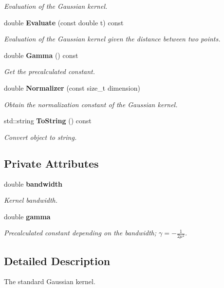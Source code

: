\begin{DoxyCompactItemize}
\begin{DoxyCompactList}\small\item\em Evaluation of the Gaussian kernel. \end{DoxyCompactList}\item 
double {\bf Evaluate} (const double t) const 
\begin{DoxyCompactList}\small\item\em Evaluation of the Gaussian kernel given the distance between two points. \end{DoxyCompactList}\item 
double {\bf Gamma} () const 
\begin{DoxyCompactList}\small\item\em Get the precalculated constant. \end{DoxyCompactList}\item 
double {\bf Normalizer} (const size\-\_\-t dimension)
\begin{DoxyCompactList}\small\item\em Obtain the normalization constant of the Gaussian kernel. \end{DoxyCompactList}\item 
std\-::string {\bf To\-String} () const 
\begin{DoxyCompactList}\small\item\em Convert object to string. \end{DoxyCompactList}\end{DoxyCompactItemize}
\subsection*{Private Attributes}
\begin{DoxyCompactItemize}
\item 
double {\bf bandwidth}
\begin{DoxyCompactList}\small\item\em Kernel bandwidth. \end{DoxyCompactList}\item 
double {\bf gamma}
\begin{DoxyCompactList}\small\item\em Precalculated constant depending on the bandwidth; $ \gamma = -\frac{1}{2 \mu^2} $. \end{DoxyCompactList}\end{DoxyCompactItemize}


\subsection{Detailed Description}
The standard Gaussian kernel. 


